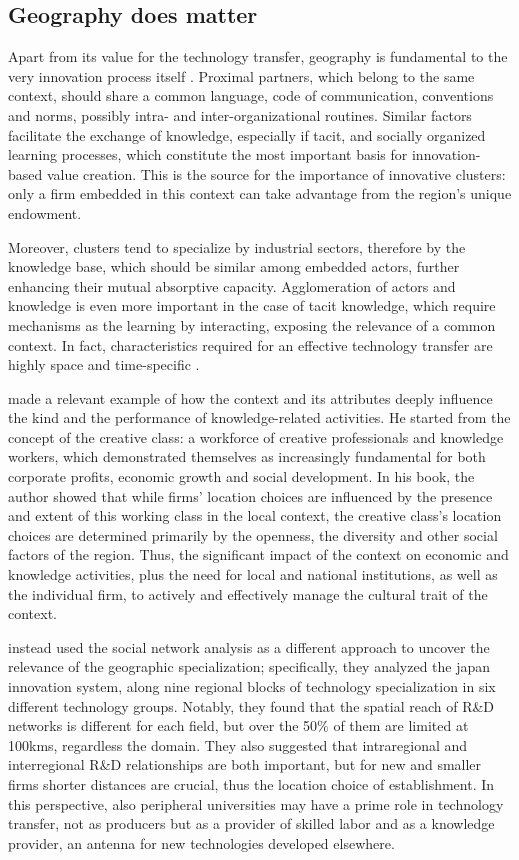 \subsection{Geography does matter}

Apart from its value for the technology transfer, geography is fundamental to the very innovation process itself \citep{Asheim2009}. Proximal partners, which belong to the same context, should share a common language, code of communication, conventions and norms, possibly intra- and inter-organizational routines. Similar factors facilitate the exchange of knowledge, especially if tacit, and socially organized learning processes, which constitute the most important basis for innovation-based value creation. This is the source for the importance of innovative clusters: only a firm embedded in this context can take advantage from the region's unique endowment. 

Moreover, clusters tend to specialize by industrial sectors, therefore by the knowledge base, which should be similar among embedded actors, further enhancing their mutual absorptive capacity. Agglomeration of actors and knowledge is even more important in the case of tacit knowledge, which require mechanisms as the learning by interacting, exposing the relevance of a common context. In fact, characteristics required for an effective technology transfer are highly space and time-specific \citep{Asheim2009}.

\citet{Florida2002} made a relevant example of how the context and its attributes deeply influence the kind and the performance of knowledge-related activities. He started from the concept of the creative class: a workforce of creative professionals and knowledge workers, which demonstrated themselves as increasingly fundamental for both corporate profits, economic growth and social development. In his book, the author showed that while firms' location choices are influenced by the presence and extent of this working class in the local context, the creative class's location choices are determined primarily by the openness, the diversity and other social factors of the region. Thus, the significant impact of the context on economic and knowledge activities, plus the need for local and national institutions, as well as the individual firm, to actively and effectively manage the cultural trait of the context. 

\citet{Yokura2013} instead used the social network analysis as a different approach to uncover the relevance of the geographic specialization; specifically, they analyzed the japan innovation system, along nine regional blocks of technology specialization in six different technology groups. Notably, they found that the spatial reach of R\&D networks is different for each field, but over the 50\% of them are limited at 100kms, regardless the domain. They also suggested that intraregional and interregional R\&D relationships are both important, but for new and smaller firms shorter distances are crucial, thus the location choice of establishment. In this perspective, also peripheral universities may have a prime role in technology transfer, not as producers but as a provider of skilled labor and as a knowledge provider, an antenna for new technologies developed elsewhere.

